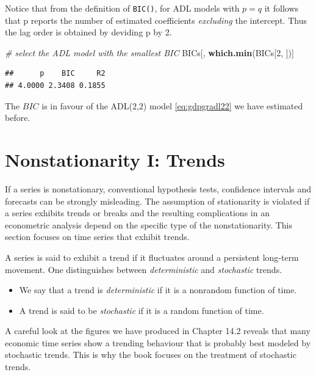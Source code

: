 \documentclass[]{book}
\newenvironment{Shaded}{\begin{snugshade}}{\end{snugshade}}
\newcommand{\KeywordTok}[1]{\textcolor[rgb]{0.13,0.29,0.53}{\textbf{#1}}}
\newcommand{\DecValTok}[1]{\textcolor[rgb]{0.00,0.00,0.81}{#1}}
\newcommand{\CommentTok}[1]{\textcolor[rgb]{0.56,0.35,0.01}{\textit{#1}}}
\newcommand{\NormalTok}[1]{#1}
\theoremstyle{definition}
\theoremstyle{definition}
\theoremstyle{definition}
\theoremstyle{remark}
\begin{document}
Notice that from the definition of \texttt{BIC()}, for ADL models with
\(p=q\) it follows that p reports the number of estimated coefficients
\emph{excluding} the intercept. Thus the lag order is obtained by
deviding p by 2.

\begin{Shaded}
\begin{Highlighting}[]
\CommentTok{# select the ADL model with the smallest BIC}
\NormalTok{BICs[, }\KeywordTok{which.min}\NormalTok{(BICs[}\DecValTok{2}\NormalTok{, ])]}
\end{Highlighting}
\end{Shaded}

\begin{verbatim}
##      p    BIC     R2 
## 4.0000 2.3408 0.1855
\end{verbatim}

The \(BIC\) is in favour of the ADL(\(2\),\(2\)) model
\eqref{eq:gdpgradl22} we have estimated before.

\section{Nonstationarity I: Trends}\label{nonstationarity-i-trends}

If a series is nonstationary, conventional hypothesis tests, confidence
intervals and forecasts can be strongly misleading. The assumption of
stationarity is violated if a series exhibits trends or breaks and the
resulting complications in an econometric analysis depend on the
specific type of the nonstationarity. This section focuses on time
series that exhibit trends.

A series is said to exhibit a trend if it fluctuates around a persistent
long-term movement. One distinguishes between \emph{deterministic} and
\emph{stochastic} trends.

\begin{itemize}
\item
  We say that a trend is \emph{deterministic} if it is a nonrandom
  function of time.
\item
  A trend is said to be \emph{stochastic} if it is a random function of
  time.
\end{itemize}

A careful look at the figures we have produced in Chapter 14.2 reveals
that many economic time series show a trending behaviour that is
probably best modeled by stochastic trends. This is why the book focuses
on the treatment of stochastic trends.
\end{document}
